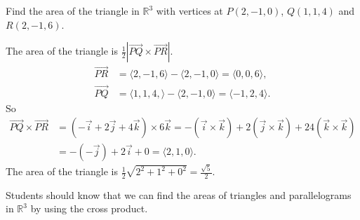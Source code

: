 \documentclass[noinstructornotes]{ximera}
\begin{document}
\begin{problem}
Find the area of the triangle in $\mathbb{R}^3$ with vertices at $P(2, -1, 0)$, $Q(1, 1, 4)$ and $R(2, -1, 6)$. 
	\begin{freeResponse}
	The area of the triangle is $\frac{1}{2} | \vec{PQ} \times \vec{PR}|$. 
	\begin{align*}
	\vec{PR} &= \langle 2, -1, 6 \rangle - \langle 2, -1, 0 \rangle = \langle 0, 0, 6 \rangle, \\
	\vec{PQ} &= \langle 1, 1, 4, \rangle - \langle 2, -1, 0 \rangle = \langle -1, 2, 4 \rangle.
	\end{align*}
	So 
	\begin{align*}
	\vec{PQ} \times \vec{PR} &= (-\vec{i} +2\vec{j} +4\vec{k})\times 6\vec{k} = - (\vec{i}\times \vec{k}) +2 (\vec{j} \times \vec{k}) +24 (\vec{k}\times \vec{k}) \\ &= - (-\vec{j}) + 2 \vec{i} + 0 = \langle 2, 1, 0 \rangle.
	\end{align*}
	The area of the triangle is $\frac{1}{2} \sqrt{2^2+1^2+0^2} = \frac{\sqrt{5}}{2}$. 
	\end{freeResponse}
		
\end{problem}

\begin{instructorNotes}
Students should know that we can find the areas of triangles and parallelograms in $\mathbb{R}^3$ by using the cross product.
\end{instructorNotes}
\end{document}

